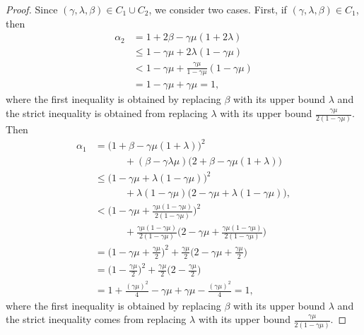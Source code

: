 \documentclass[10pt,a4paper]{amsart}
\begin{document}
    \begin{proof}
        Since $(\gamma,\lambda,\beta)\in C_1\cup C_2$, we consider two cases.
    First, if $(\gamma,\lambda,\beta)\in C_1$, then
    \begin{align}
        \alpha_2 &= 1 + 2\beta - \gamma\mu(1+2\lambda)
        \\ &\leq 1 - \gamma\mu + 2\lambda(1-\gamma\mu)
        \\ &< 1 - \gamma\mu + \frac{\gamma\mu}{1-\gamma\mu}(1-\gamma\mu)
        \\ &= 1 -\gamma\mu + \gamma\mu =1,
    \end{align}
    where the first inequality is obtained by replacing $\beta$ with its upper bound $\lambda$ and the strict inequality is obtained from replacing $\lambda$ with its upper bound $\frac{\gamma\mu}{2(1-\gamma\mu)}$.
    Then
    \begin{align}
        \alpha_1 &= \big(1+\beta-\gamma\mu(1+\lambda)\big)^2
        \\ &\quad\quad\quad+(\beta-\gamma\lambda\mu)\big(2+\beta-\gamma\mu(1+\lambda)\big)
        \\&\leq \big(1 -\gamma\mu+\lambda(1-\gamma\mu)\big)^2
        \\ &\quad\quad\quad + \lambda(1-\gamma\mu)\big(2-\gamma\mu + \lambda(1-\gamma\mu)\big),
        \\ &<\Big(1-\gamma\mu + \frac{\gamma\mu(1-\gamma\mu)}{2(1-\gamma\mu)}\Big)^2
        \\ &\quad\quad\quad + \frac{\gamma\mu(1-\gamma\mu)}{2(1-\gamma\mu)}\Big(2 - \gamma\mu + \frac{\gamma\mu(1-\gamma\mu)}{2(1-\gamma\mu)}\Big)
        \\ &= \big(1-\gamma\mu + \frac{\gamma\mu}{2}\big)^2 + \frac{\gamma\mu}{2}\big(2-\gamma\mu +\frac{\gamma\mu}{2}\big)
        \\ &= \big(1-\frac{\gamma\mu}{2}\big)^2+ \frac{\gamma\mu}{2}\big(2-\frac{\gamma\mu}{2}\big)
        \\ &= 1 + \frac{(\gamma\mu)^2}{4}- \gamma\mu + \gamma\mu - \frac{(\gamma\mu)^2}{4} = 1,
    \end{align}
    where the first inequality is obtained by replacing $\beta$ with its upper bound $\lambda$ and the strict inequality comes from replacing $\lambda$ with its upper bound $\frac{\gamma\mu}{2(1-\gamma\mu)}$.
        

\end{proof}
\end{document}
